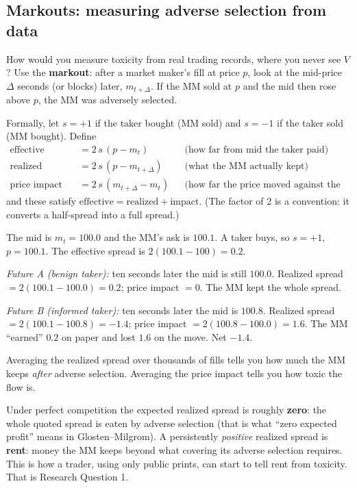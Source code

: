 \documentclass[11pt]{article}
\begin{document}
\subsection{Markouts: measuring adverse selection from data}\label{sec:markout}
How would you measure toxicity from real trading records, where you never see $V$? Use the \textbf{markout}: after a market maker's fill at price $p$, look at the mid-price $\Delta$ seconds (or blocks) later, $m_{t+\Delta}$. If the MM sold at $p$ and the mid then rose above $p$, the MM was adversely selected.

Formally, let $s=+1$ if the taker bought (MM sold) and $s=-1$ if the taker sold (MM bought). Define
\begin{align*}
\text{effective spread} &= 2\,s\,(p-m_t) && \text{(how far from mid the taker paid)}\\
\text{realized spread}  &= 2\,s\,(p-m_{t+\Delta}) && \text{(what the MM actually kept)}\\
\text{price impact}     &= 2\,s\,(m_{t+\Delta}-m_t) && \text{(how far the price moved against the MM)}
\end{align*}
and these satisfy $\text{effective}=\text{realized}+\text{impact}$. (The factor of 2 is a convention: it converts a half-spread into a full spread.)

\begin{example}
The mid is $m_t=100.0$ and the MM's ask is $100.1$. A taker buys, so $s=+1$, $p=100.1$. The effective spread is $2(100.1-100)=0.2$.

\emph{Future A (benign taker):} ten seconds later the mid is still $100.0$. Realized spread $=2(100.1-100.0)=0.2$; price impact $=0$. The MM kept the whole spread.

\emph{Future B (informed taker):} ten seconds later the mid is $100.8$. Realized spread $=2(100.1-100.8)=-1.4$; price impact $=2(100.8-100.0)=1.6$. The MM ``earned'' $0.2$ on paper and lost $1.6$ on the move. Net $-1.4$.

Averaging the realized spread over thousands of fills tells you how much the MM keeps \emph{after} adverse selection. Averaging the price impact tells you how toxic the flow is.
\end{example}

\begin{intuition}
Under perfect competition the expected realized spread is roughly \textbf{zero}: the whole quoted spread is eaten by adverse selection (that is what ``zero expected profit'' means in Glosten--Milgrom). A persistently \emph{positive} realized spread is \textbf{rent}: money the MM keeps beyond what covering its adverse selection requires. This is how a trader, using only public prints, can start to tell rent from toxicity. That is Research Question 1.
\end{intuition}
\end{document}
